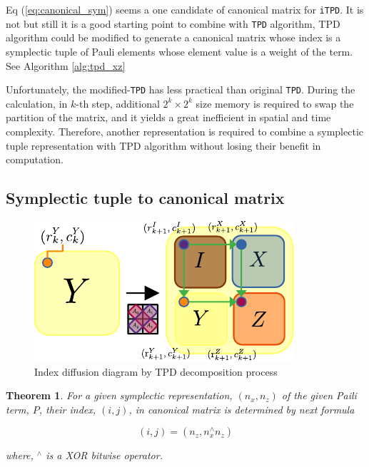 \documentclass[twocolumn]{article}
\newtheorem{theorem}{Theorem}
\begin{document}
Eq (\ref{eq:canonical_sym}) seems a one candidate of canonical matrix 
for \texttt{iTPD}. It is not but still it is a good starting point to combine with \texttt{TPD} algorithm, 
TPD algorithm could be modified to generate a canonical matrix
whose index is a symplectic tuple of Pauli elements whose element value is a weight of the term.
See Algorithm \ref{alg:tpd_xz}

Unfortunately, the modified-\texttt{TPD} has less practical than 
original \texttt{TPD}.
During the calculation, in $k$-th step, additional $2^k \times 2^k$ size memory 
is required to swap the partition of the matrix, and it yields 
a great inefficient in spatial and time complexity.
Therefore, another representation is required to combine a symplectic tuple representation with
TPD algorithm without losing their benefit in computation.

\subsection{Symplectic tuple to canonical matrix}

\begin{figure}
    \includegraphics[width=\linewidth]{index_change_tpd.pdf}
    \caption{Index diffusion diagram by TPD decomposition process}
    \label{fig:index_change_tpd}
\end{figure}

\begin{theorem}
    \label{thm:index_conversion}
    For a given symplectic representation, $(n_x, n_z)$ of the given Paili term, $P$,
    their index, $(i, j)$, in canonical matrix is determined by next formula

    \begin{equation}
        \label{eq:ij_nznx}
        (i, j) = (n_z, n_x^\wedge n_z)
    \end{equation}

    where, ${}^\wedge$ is a XOR bitwise operator. 
\end{theorem}
\end{document}
